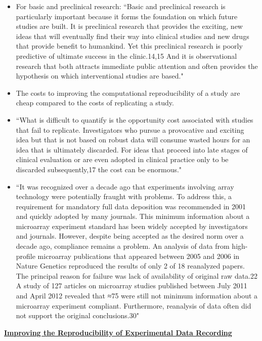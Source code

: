 \documentclass[pdftex,english,11pt,parskip=half]{scrartcl}
\begin{document}
\begin{itemize}
\item For basic and preclinical research: ``Basic and preclinical research is particularly important
because it forms the foundation on which future studies are
built. It is preclinical research that provides the exciting, new
ideas that will eventually find their way into clinical studies
and new drugs that provide benefit to humankind. Yet this preclinical
research is poorly predictive of ultimate success in the
clinic.14,15 And it is observational research that both attracts
immediate public attention and often provides the hypothesis
on which interventional studies are based." \cite{begley2015reproducibility}
\item The costs to improving the computational reproducibility of a study are cheap compared to the costs of replicating a study.
\item ``What is difficult to quantify is the opportunity cost associated
with studies that fail to replicate. Investigators who pursue
a provocative and exciting idea but that is not based on robust
data will consume wasted hours for an idea that is ultimately
discarded. For ideas that proceed into late stages of clinical
evaluation or are even adopted in clinical practice only to be
discarded subsequently,17 the cost can be enormous." \cite{begley2015reproducibility}
\item ``It was recognized over a decade ago that experiments involving
array technology were potentially fraught with problems.
To address this, a requirement for mandatory full data
deposition was recommended in 2001 and quickly adopted by
many journals. This minimum information about a microarray
experiment standard has been widely accepted by investigators
and journals. However, despite being accepted as the desired
norm over a decade ago, compliance remains a problem.
An analysis of data from high-profile microarray publications
that appeared between 2005 and 2006 in Nature Genetics reproduced
the results of only 2 of 18 reanalyzed papers. The
principal reason for failure was lack of availability of original
raw data.22 A study of 127 articles on microarray studies published
between July 2011 and April 2012 revealed that ≈75%
were still not minimum information about a microarray experiment
compliant. Furthermore, reanalysis of data often did not
support the original conclusions.30" \cite{begley2015reproducibility}
\end{itemize}

\underline{\textbf{Improving the Reproducibility of Experimental Data
Recording}} 
\end{document}
